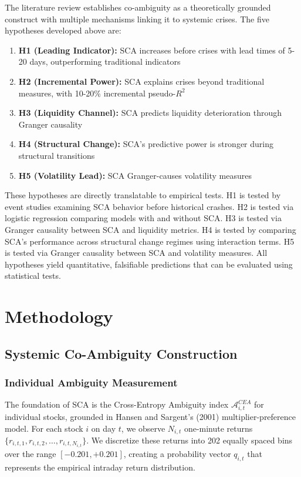 \documentclass[preprint,12pt,authoryear]{elsarticle}
\begin{document}
The literature review establishes co-ambiguity as a theoretically grounded construct with multiple mechanisms linking it to systemic crises. The five hypotheses developed above are:
\begin{enumerate}
\item \textbf{H1 (Leading Indicator):} SCA increases before crises with lead times of 5-20 days, outperforming traditional indicators
\item \textbf{H2 (Incremental Power):} SCA explains crises beyond traditional measures, with 10-20\% incremental pseudo-$R^2$
\item \textbf{H3 (Liquidity Channel):} SCA predicts liquidity deterioration through Granger causality
\item \textbf{H4 (Structural Change):} SCA's predictive power is stronger during structural transitions
\item \textbf{H5 (Volatility Lead):} SCA Granger-causes volatility measures
\end{enumerate}

These hypotheses are directly translatable to empirical tests. H1 is tested by event studies examining SCA behavior before historical crashes. H2 is tested via logistic regression comparing models with and without SCA. H3 is tested via Granger causality between SCA and liquidity metrics. H4 is tested by comparing SCA's performance across structural change regimes using interaction terms. H5 is tested via Granger causality between SCA and volatility measures. All hypotheses yield quantitative, falsifiable predictions that can be evaluated using statistical tests.

\section{Methodology}

\subsection{Systemic Co-Ambiguity Construction}

\subsubsection{Individual Ambiguity Measurement}

The foundation of SCA is the Cross-Entropy Ambiguity index $\mathcal{A}^{CEA}_{i,t}$ for individual stocks, grounded in Hansen and Sargent's (2001) multiplier-preference model. For each stock $i$ on day $t$, we observe $N_{i,t}$ one-minute returns $\{r_{i,t,1}, r_{i,t,2}, \ldots, r_{i,t,N_{i,t}}\}$. We discretize these returns into 202 equally spaced bins over the range $[-0.201, +0.201]$, creating a probability vector $q_{i,t}$ that represents the empirical intraday return distribution.
\end{document}
